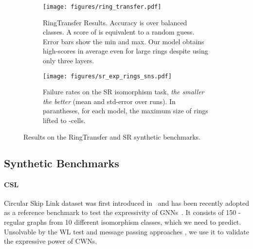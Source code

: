 \documentclass{article}
\begin{document}
\begin{figure}[t]
    \centering
    \begin{subfigure}[t!]{0.44\textwidth}
        \centering
        \texttt{[image: figures/ring\_transfer.pdf]}
        \caption{RingTransfer Results. Accuracy is over  balanced classes. A score of  is equivalent to a random guess. Error bars show the min and max. Our model obtains high-scores in average even for large rings despite using only three layers.}
        \label{fig:rt}
    \end{subfigure}
    \hfill
    \begin{subfigure}[t!]{0.53\textwidth}
        \centering
        \texttt{[image: figures/sr\_exp\_rings\_sns.pdf]}
        \caption{Failure rates on the SR isomorphism task, \emph{the smaller the better} (mean and std-error over  runs). In parantheses, for each model, the maximum size  of rings lifted to -cells.}
        \label{fig:sr_iso}
    \end{subfigure}
    \caption{Results on the RingTransfer and SR synthetic benchmarks.}
    \label{fig:synth}
    \vspace{-12pt}
\end{figure}

\subsection{Synthetic Benchmarks}\label{ss:synth}



\paragraph{CSL} Circular Skip Link dataset was first introduced in~\cite{pmlr-v97-murphy19a} and has been recently adopted as a reference benchmark to test the expressivity of GNNs~\citep{dwivedi2020benchmarkgnns}. It consists of 150 -regular graphs from 10 different isomorphism classes, which we need to predict. 
Unsolvable by the WL test and message passing approaches \citep{pmlr-v97-murphy19a, Chen2019_ring_gnn}, we use it to validate the expressive power of CWNs. 
\end{document}
